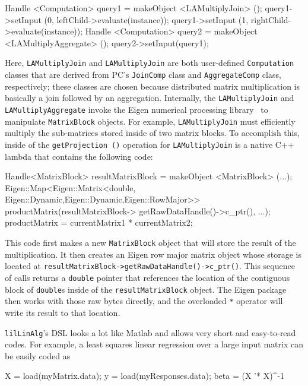 \begin{codesmall}
Handle <Computation> query1 = 
         makeObject <LAMultiplyJoin> ();
query1->setInput (0, leftChild->evaluate(instance));
query1->setInput (1, rightChild->evaluate(instance));
Handle <Computation> query2 = 
         makeObject <LAMultiplyAggregate> ();
query2->setInput(query1);
\end{codesmall}

\noindent Here, \texttt{LAMultiplyJoin} and \texttt{LAMultiplyJoin} are 
both user-defined \texttt{Computation} classes that are
derived from PC's \texttt{JoinComp} class and \texttt{AggregateComp} class, respectively; these classes are chosen 
because distributed matrix multiplication
is basically a join followed by an aggregation.
Internally, the \texttt{LAMultiplyJoin}
and \texttt{LAMultiplyAggregate} invoke the Eigen numerical processing
library~\cite{eigen} to manipulate \texttt{MatrixBlock} objects.
For example, \texttt{LAMultiplyJoin} must efficiently multiply the sub-matrices stored inside of two matrix blocks.
To accomplish this, inside of the \texttt{getProjection ()} operation for
\texttt{LAMultiplyJoin} is a native C++ lambda that contains the following code:

\begin{code}
Handle<MatrixBlock> resultMatrixBlock 
   = makeObject <MatrixBlock> (...);
Eigen::Map<Eigen::Matrix<double,
   Eigen::Dynamic,Eigen::Dynamic,Eigen::RowMajor>> 
   productMatrix(resultMatrixBlock->
      getRawDataHandle()->c_ptr(), ...);
productMatrix = currentMatrix1 * currentMatrix2;
\end{code}

\noindent This code first makes a new \texttt{MatrixBlock} object that will store the result of the multiplication.
 It then creates an 
Eigen row major matrix object whose storage is located at 
\texttt{resultMatrixBlock->}\-\texttt{getRaw}\-\texttt{DataHandle()->}\-\texttt{c\_ptr()}.  This
sequence of calls
returns a \texttt{double} pointer that references the location of the contiguous block of \texttt{double}s inside of
the \texttt{resultMatrixBlock} object.
The Eigen package then works with those raw bytes directly,
and the overloaded \texttt{*} operator will write its result to that location.

\texttt{lilLinAlg}'s DSL looks a lot like Matlab and allows very short and easy-to-read codes.
For example, 
a least squares linear regression over a large input matrix can be easily coded as

\begin{code}
X = load(myMatrix.data); 
y = load(myResponses.data); 
beta = (X '* X)^-1 %
\end{code}

